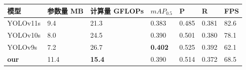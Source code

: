 \begin{table}[htbp]
    \centering
    \captionsetup{font=footnotesize}
    \label{tab:compare_studies_vd}
    \begin{tabular}{p{}p{}p{}p{}p{}p{}p{}}
        \toprule
        模型       & 参数量 MB & 计算量 GFLOPs & $mAP_{0.5}$   & P     & R     & FPS \\ 
        \midrule
        YOLOv11s     & 9.4   & 21.3         & 0.383           & 0.485  & 0.381 & 82.6 \\
        YOLOv10s     & 8.0   & 24.5         & 0.390           & 0.501  & 0.380 & 78.1 \\
        YOLOv9s      & 7.2   & 26.7         & \textbf{0.402}           & 0.525  & 0.392 & 62.1 \\
        \textbf{our} & 11.4  & \textbf{15.4} & 0.390 & 0.514  & 0.372 & 68.5 \\
        \bottomrule
    \end{tabular}
\end{table}


